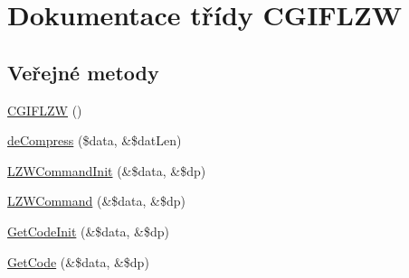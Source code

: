 \hypertarget{class_c_g_i_f_l_z_w}{\section{Dokumentace třídy C\-G\-I\-F\-L\-Z\-W}
\label{class_c_g_i_f_l_z_w}
}
\subsection*{Veřejné metody}
\begin{DoxyCompactItemize}
\item 
\hyperlink{class_c_g_i_f_l_z_w_ad0fffef728a34e5313cdc01debbd0c39}{C\-G\-I\-F\-L\-Z\-W} ()
\item 
\hyperlink{class_c_g_i_f_l_z_w_a9aaefb6919770696a17f9326a415cdf6}{de\-Compress} (\$data, \&\$dat\-Len)
\item 
\hyperlink{class_c_g_i_f_l_z_w_a9c8d0942688ece8c197f8549454118de}{L\-Z\-W\-Command\-Init} (\&\$data, \&\$dp)
\item 
\hyperlink{class_c_g_i_f_l_z_w_accfe1f295b3a55d5ee585ec1a79421ac}{L\-Z\-W\-Command} (\&\$data, \&\$dp)
\item 
\hyperlink{class_c_g_i_f_l_z_w_a3abbf7782b12f98ea228cac26a5540b7}{Get\-Code\-Init} (\&\$data, \&\$dp)
\item 
\hyperlink{class_c_g_i_f_l_z_w_a92207df0a69b7c6d157569b95441c1db}{Get\-Code} (\&\$data, \&\$dp)
\end{DoxyCompactItemize}
